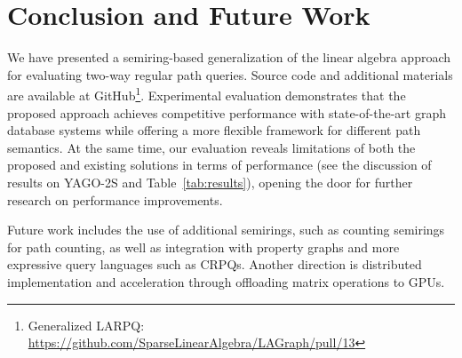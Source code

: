 \section{Conclusion and Future Work}\label{sec:conclusion}

We have presented a semiring-based generalization of the linear algebra approach for evaluating two-way regular path queries.
Source code and additional materials are available at GitHub\footnote{Generalized LARPQ: \url{https://github.com/SparseLinearAlgebra/LAGraph/pull/13}}.
Experimental evaluation demonstrates that the proposed approach achieves competitive performance with state-of-the-art graph database systems while offering a more flexible framework for different path semantics.
At the same time, our evaluation reveals limitations of both the proposed and existing solutions in terms of performance (see the discussion of results on YAGO-2S and Table~\ref{tab:results}), opening the door for further research on performance improvements.

Future work includes the use of additional semirings, such as counting semirings for path counting, as well as integration with property graphs and more expressive query languages such as CRPQs.
Another direction is distributed implementation and acceleration through offloading matrix operations to GPUs.

